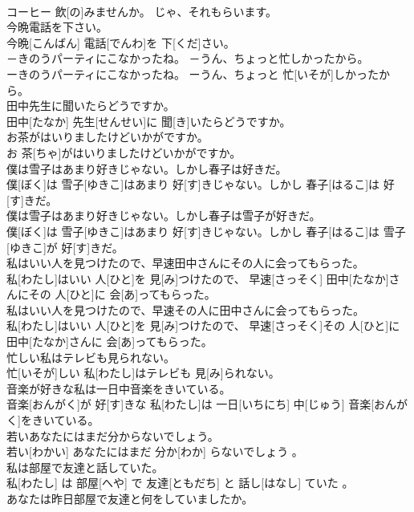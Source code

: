 \documentclass[8pt]{extreport}
\begin{document}
\begin{CJK}{UTF8}{min}
\\	コーヒー 飲[の]みませんか。 じゃ、それもらいます。
\\	今晩電話を下さい。	
\\	今晩[こんばん] 電話[でんわ]を 下[くだ]さい。
\\	－きのうパーティにこなかったね。 －うん、ちょっと忙しかったから。	
\\	ーきのうパーティにこなかったね。 ーうん、ちょっと 忙[いそが]しかったから。
\\	田中先生に聞いたらどうですか。	
\\	田中[たなか] 先生[せんせい]に 聞[き]いたらどうですか。
\\	お茶がはいりましたけどいかがですか。	
\\	お 茶[ちゃ]がはいりましたけどいかがですか。
\\	僕は雪子はあまり好きじゃない。しかし春子は好きだ。	
\\	僕[ぼく]は 雪子[ゆきこ]はあまり 好[す]きじゃない。しかし 春子[はるこ]は 好[す]きだ。
\\	僕は雪子はあまり好きじゃない。しかし春子は雪子が好きだ。	
\\	僕[ぼく]は 雪子[ゆきこ]はあまり 好[す]きじゃない。しかし 春子[はるこ]は 雪子[ゆきこ]が 好[す]きだ。
\\	私はいい人を見つけたので、早速田中さんにその人に会ってもらった。	
\\	私[わたし]はいい 人[ひと]を 見[み]つけたので、 早速[さっそく] 田中[たなか]さんにその 人[ひと]に 会[あ]ってもらった。
\\	私はいい人を見つけたので、早速その人に田中さんに会ってもらった。	
\\	私[わたし]はいい 人[ひと]を 見[み]つけたので、 早速[さっそく]その 人[ひと]に 田中[たなか]さんに 会[あ]ってもらった。
\\	忙しい私はテレビも見られない。	
\\	忙[いそが]しい 私[わたし]はテレビも 見[み]られない。
\\	音楽が好きな私は一日中音楽をきいている。	
\\	音楽[おんがく]が 好[す]きな 私[わたし]は 一日[いちにち] 中[じゅう] 音楽[おんがく]をきいている。
\\	若いあなたにはまだ分からないでしょう。	
\\	若い[わかい] あなたにはまだ 分か[わか] らないでしょう 。
\\	私は部屋で友達と話していた。	
\\	私[わたし] は 部屋[へや] で 友達[ともだち] と 話し[はなし] ていた 。
\\	あなたは昨日部屋で友達と何をしていましたか。	

\end{CJK}
\end{document}
